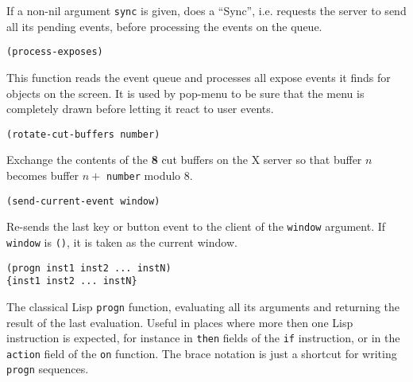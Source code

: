 If a non-nil argument \verb"sync" is given, {\GWM} does a ``Sync'',
i.e. requests the server to send all its pending events, before
processing the events on the queue.

        
{\usagefont\begin{verbatim}
(process-exposes)
\end{verbatim}}\usageupspace

This function reads the event queue and processes all expose events it finds
for {\GWM} objects on the screen. It is used by pop-menu to be sure that the
menu is completely drawn before letting it react to user events.


{\usagefont\begin{verbatim}
(rotate-cut-buffers number)
\end{verbatim}}\usageupspace

Exchange the contents of the {\bf 8} cut buffers on the X server so that
buffer $n$ becomes buffer $n + $ \verb"number" modulo 8.


{\usagefont\begin{verbatim}
(send-current-event window)
\end{verbatim}}\usageupspace

Re-sends the last key or button event to the client of the \verb"window"
argument. If \verb"window" is \verb"()", it is taken as the current window.

        
{\usagefont\begin{verbatim}
(progn inst1 inst2 ... instN)
{inst1 inst2 ... instN}
\end{verbatim}}\usageupspace

The classical Lisp \verb"progn" function, evaluating all its arguments and
returning the result of the last evaluation. Useful in places where
more then one Lisp instruction is expected, for instance in
\verb"then" fields of the \verb"if" instruction, or in the
\verb"action" field of the \verb"on" function. The brace notation is
just a shortcut for writing \verb"progn" sequences.

        
